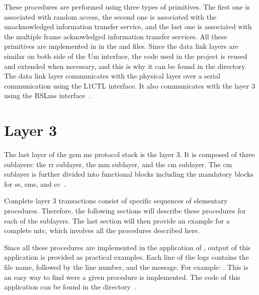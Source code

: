   These procedures are performed using three types of primitives. The
  first one is associated with random access, the second one is
  associated with the unacknowledged information transfer service, and
  the last one is associated with the multiple frame acknowledged
  information transfer services. All these primitives are implemented in
   in the  and
   files. Since the data
  link layers are similar on both side of the Um interface, the code
  used in the  project is reused and extended when
  necessary, and this is why it can be found in the
   directory. The data link layer
  communicates with the physical layer over a serial communication using
  the L1CTL interface. It also communicates with the layer 3 using the
  RSLms interface~\cite{osmocombb_ms-side_????,welte_osmocombb:_2010-1}.

  \iffalse
  interface between Layer2 and Layer3 called RSLms
  In the GSM network, Um Layer2 terminates at the BTS but
  is controlled by the BSC
  Reuse this GSM 08.58 Radio Signalling Link
  Extend it where needed for the MS case
  \fi

\section{Layer 3}

  The last layer of the \gls{gsm} \gls{ms} protocol stack is the layer
  3. It is composed of three sublayers: the \gls{rr} sublayer, the
  \gls{mm} sublayer, and the \gls{cm} sublayer. The \gls{cm} sublayer is
  further divided into functional blocks including the mandatory blocks
  for \gls{ss}, \gls{sms}, and \gls{cc}~\cite{3gpp_ts_2014-6}.

  Complete layer 3 transactions consist of specific sequences of
  elementary procedures. Therefore, the following sections will describe
  these procedures for each of the sublayers. The last section will then
  provide an example for a complete \gls{mtc}, which involves all the
  procedures described here.
  
  Since all these procedures are implemented in the 
  application of , output of this application is
  provided as practical examples. Each line of the logs contains the
  file name, followed by the line number, and the message. For example:
  . This is an easy way to
  find were a given procedure is implemented. The code of this
  application can be found in the 
  directory~\cite{3gpp_ts_2015-2,osmocombb_ms-side_????}.


